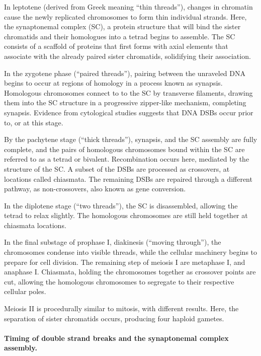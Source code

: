 In leptotene (derived from Greek meaning ``thin threads''), changes in chromatin cause the newly replicated chromosomes to form thin individual strands.
Here, the synaptonemal complex (SC), a protein structure that will bind the sister chromatids and their homologues into a tetrad begins to assemble.
The SC consists of a scaffold of proteins that first forms with axial elements that associate with the already paired sister chromatids, solidifying their association.

In the zygotene phase (``paired threads''), pairing between the unraveled DNA begins to occur at regions of homology in a process known as synapsis.
Homologous chromosomes connect to to the SC by transverse filaments, drawing them into the SC structure in a progressive zipper-like mechanism, completing synapsis\cite{Yang2009}.
Evidence from cytological studies suggests that DNA DSBs occur prior to, or at this stage\cite{Oliver-Bonet2005,Gruhn2013}.

By the pachytene stage (``thick threads''), synapsis, and the SC assembly are fully complete, and the pairs of homologous chromosomes bound within the SC are referred to as a tetrad or bivalent.
Recombination occurs here, mediated by the structure of the SC.
A subset of the DSBs are processed as crossovers, at locations called chiasmata.
The remaining DSBs are repaired through a different pathway, as non-crossovers, also known as gene conversion.

In the diplotene stage (``two threads''), the SC is disassembled, allowing the tetrad to relax slightly.
The homologous chromosomes are still held together at chiasmata locations.

In the final substage of prophase I, diakinesis (``moving through''), the chromosomes condense into visible threads, while the cellular machinery begins to prepare for cell division.
The remaining step of meiosis I are metaphase I, and anaphase I.
Chiasmata, holding the chromosomes together as crossover points are cut, allowing the homologous chromosomes to segregate to their respective cellular poles.

Meiosis II is procedurally similar to mitosis, with different results.
Here, the separation of sister chromatids occurs, producing four haploid gametes.



\paragraph{Timing of double strand breaks and the synaptonemal complex assembly.}

